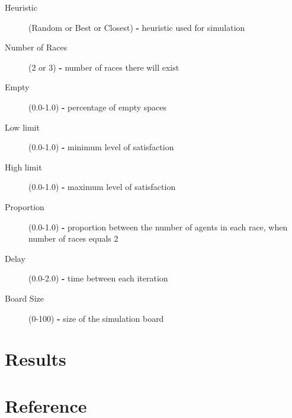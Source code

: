 \documentclass[a4paper,titlepage,11pt]{article}
\begin{document}
\begin{description}
\item [ Heuristic ] (Random or Best or Closest) \textbf{-} heuristic used for simulation
\item [ Number of Races ] (2 or 3) \textbf{-} number of races there will exist
\item [ Empty ] (0.0-1.0) \textbf{-} percentage of empty spaces
\item [ Low limit ] (0.0-1.0) \textbf{-} minimum level of satisfaction
\item [ High limit ] (0.0-1.0) \textbf{-} maximum level of satisfaction
\item [ Proportion ] (0.0-1.0) \textbf{-} proportion between the number of agents in each race, when number of races equals 2
\item [ Delay ] (0.0-2.0) \textbf{-} time between each iteration
\item [ Board Size ] (0-100) \textbf{-} size of the simulation board
\end{description}

\section{Results}

\section{Reference}
\end{document}
